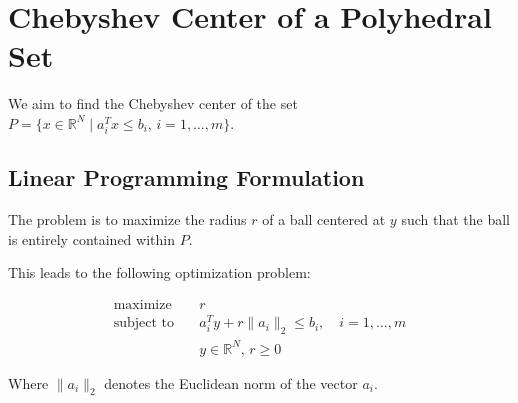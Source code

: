 \documentclass{article}
\begin{document}
\section*{Chebyshev Center of a Polyhedral Set}

We aim to find the Chebyshev center of the set \( P = \{ x \in \mathbb{R}^N \mid a_i^T x \leq b_i, \, i = 1, \ldots, m \} \).

\subsection*{Linear Programming Formulation}

The problem is to maximize the radius \( r \) of a ball centered at \( y \) such that the ball is entirely contained within \( P \).

This leads to the following optimization problem:

\[
\begin{align*}
\text{maximize} \quad & r \\
\text{subject to} \quad & a_i^T y + r \|a_i\|_2 \leq b_i, \quad i = 1, \ldots, m \\
& y \in \mathbb{R}^N, \, r \geq 0
\end{align*}
\]

Where \( \|a_i\|_2 \) denotes the Euclidean norm of the vector \( a_i \).
\end{document}
